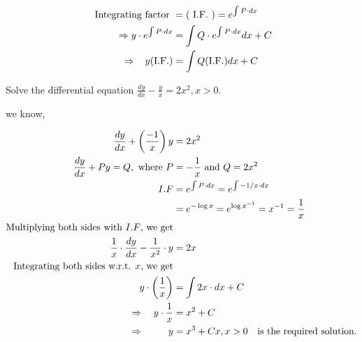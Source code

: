 \begin{align*}
\text { Integrating factor }&=(\text { I.F. })=e^{\int P \cdot d x} \\
\Rightarrow y \cdot e^{\int P \cdot d x}&=\int Q \cdot e^{\int P \cdot d x} d x+C \\
\Rightarrow \hspace{0.3cm}y(\mathrm{I.F.})&=\int Q(\mathrm{I.F.}) d x+C\\
\end{align*}

\begin{exercise}
	Solve the differential equation $\frac{d y}{d x}-\frac{y}{x}=2 x^{2}, x>0$.
\end{exercise}
\begin{answer}
	we know,
	
	\begin{align*}
		\frac{d y}{d x}+\left(\frac{-1}{x}\right) y &=2 x^{2}\\
		\frac{d y}{d x}+P y=Q, \text { where } P &=-\frac{1}{x} \text { and } Q=2 x^{2}\\
		I.F&=e^{\int P \cdot d x}=e^{\int-1 / x \cdot d x}\\&=e^{-\log x}=e^{\log x^{-1}}=x^{-1}=\frac{1}{x}\\
		\text{Multiplying both sides with $I.F$, we get}\\\frac{1}{x} \cdot \frac{d y}{d x}-\frac{1}{x^{2}} \cdot y&=2 x\\
		\text{Integrating both sides w.r.t. $x,$ we get}\\y \cdot\left(\frac{1}{x}\right)&=\int 2 x \cdot d x+C \\
		\Rightarrow \quad y \cdot \frac{1}{x}&=x^{2}+C\\\Rightarrow\hspace{0.9cm} y&=x^{3}+C x, x>0 \quad \text{is the required solution.}
	\end{align*}
\end{answer}
